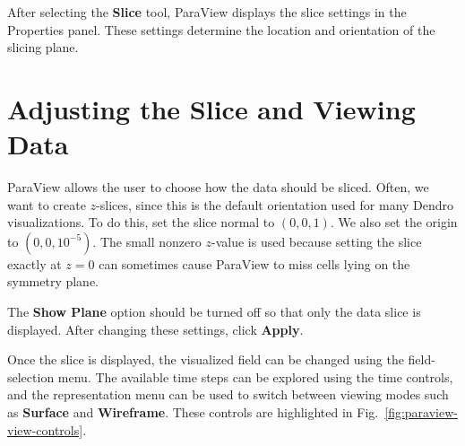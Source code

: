 After selecting the \textbf{Slice} tool, ParaView displays the slice settings
in the Properties panel. These settings determine the location and orientation
of the slicing plane.

\section{Adjusting the Slice and Viewing Data}
\label{sec:paraview-adjusting-slice}

ParaView allows the user to choose how the data should be sliced. Often, we want
to create $z$-slices, since this is the default orientation used for many
Dendro visualizations. To do this, set the slice normal to $(0,0,1)$. We also
set the origin to $(0,0,10^{-5})$. The small nonzero $z$-value is used because
setting the slice exactly at $z=0$ can sometimes cause ParaView to miss cells
lying on the symmetry plane.

The \textbf{Show Plane} option should be turned off so that only the data slice
is displayed. After changing these settings, click \textbf{Apply}.

Once the slice is displayed, the visualized field can be changed using the
field-selection menu. The available time steps can be explored using the time
controls, and the representation menu can be used to switch between viewing
modes such as \textbf{Surface} and \textbf{Wireframe}. These controls are
highlighted in Fig.~\ref{fig:paraview-view-controls}.

